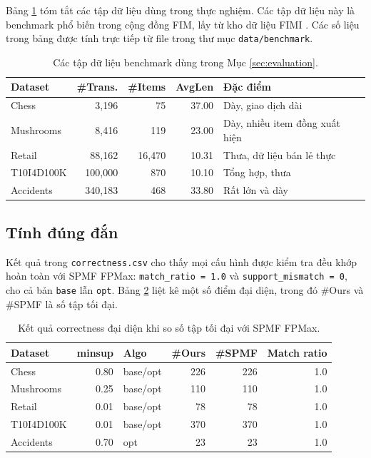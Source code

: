 Bảng \ref{tab:benchmark-datasets} tóm tắt các tập dữ liệu dùng trong thực nghiệm. Các tập dữ liệu này là benchmark phổ biến trong cộng đồng FIM, lấy từ kho dữ liệu FIMI \cite{Goethals2003FIMI}. Các số liệu trong bảng được tính trực tiếp từ file trong thư mục \texttt{data/benchmark}.

\begin{table}[H]
    \centering
    \caption{Các tập dữ liệu benchmark dùng trong Mục \ref{sec:evaluation}.}
    \label{tab:benchmark-datasets}
    \begin{tabular}{l r r r l}
        \toprule
        Dataset & \#Trans. & \#Items & AvgLen & Đặc điểm \\
        \midrule
        Chess & 3,196 & 75 & 37.00 & Dày, giao dịch dài \\
        Mushrooms & 8,416 & 119 & 23.00 & Dày, nhiều item đồng xuất hiện \\
        Retail & 88,162 & 16,470 & 10.31 & Thưa, dữ liệu bán lẻ thực \\
        T10I4D100K & 100,000 & 870 & 10.10 & Tổng hợp, thưa \\
        Accidents & 340,183 & 468 & 33.80 & Rất lớn và dày \\
        \bottomrule
    \end{tabular}
\end{table}

\subsection{Tính đúng đắn}

Kết quả trong \texttt{correctness.csv} cho thấy mọi cấu hình được kiểm tra đều khớp hoàn toàn với SPMF FPMax: \texttt{match\_ratio = 1.0} và \texttt{support\_mismatch = 0}, cho cả bản \texttt{base} lẫn \texttt{opt}. Bảng \ref{tab:correctness-summary} liệt kê một số điểm đại diện, trong đó \#Ours và \#SPMF là số tập tối đại.

\begin{table}[H]
    \centering
    \caption{Kết quả correctness đại diện khi so số tập tối đại với SPMF FPMax.}
    \label{tab:correctness-summary}
    \begin{tabular}{l r l r r r}
        \toprule
        Dataset & minsup & Algo & \#Ours & \#SPMF & Match ratio \\
        \midrule
        Chess & 0.80 & base/opt & 226 & 226 & 1.0 \\
        Mushrooms & 0.25 & base/opt & 110 & 110 & 1.0 \\
        Retail & 0.01 & base/opt & 78 & 78 & 1.0 \\
        T10I4D100K & 0.01 & base/opt & 370 & 370 & 1.0 \\
        Accidents & 0.70 & opt & 23 & 23 & 1.0 \\
        \bottomrule
    \end{tabular}
\end{table}

